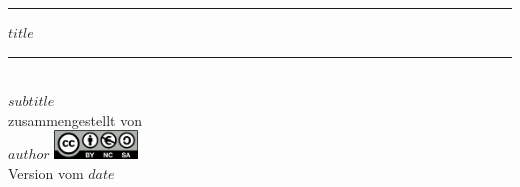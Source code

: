 \begin{titlepage}
\begin{center}
\noindent\rule[1ex]{\textwidth}{0.5pt}
 \Huge \textbf{$title$}\\[4mm]
\end{center}
\noindent\rule[1ex]{\textwidth}{0.5pt}
 \normalsize
\vfill

{\centering
 \\
\vfill
\Large $subtitle$ \\[10mm]
\normalsize zusammengestellt von\\   $author$
\vfill
\includegraphics[width=22mm]{images/ccbyncsa.png}\\
\scriptsize Version vom $date$\normalsize

}
\thispagestyle{empty}
\end{titlepage}

